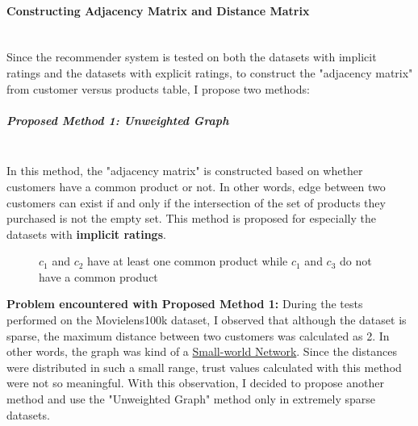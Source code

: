 	\paragraph{Constructing Adjacency Matrix and Distance Matrix}\mbox{}\\
	Since the recommender system is tested on both the datasets with implicit ratings and the datasets with explicit ratings, to construct the "adjacency matrix" from customer versus products table, I propose two methods: 
	\subparagraph{Proposed Method 1: Unweighted Graph}\mbox{}\\
	\label{prop_method_1}
	In this method, the "adjacency matrix" is constructed based on whether customers have a common product or not. In other words, edge between two customers can exist if and only if the intersection of the set of products they purchased is not the empty set. This method is proposed for especially the datasets with \textbf{implicit ratings}.
	\begin{figure}[H]
		\centering
		\caption{$c_{1}$ and $c_{2}$ have at least one common product while $c_{1}$ and $c_{3}$ do not have a common product}
	\end{figure}

	\textbf{Problem encountered with Proposed Method 1:} During the tests performed on the Movielens100k dataset, I observed that although the dataset is sparse, the maximum distance between two customers was calculated as 2. In other words, the graph was kind of a \href{https://en.wikipedia.org/wiki/Small-world_network}{Small-world Network}. Since the distances were distributed in such a small range, trust values calculated with this method were not so meaningful. With this observation, I decided to propose another method and use the "Unweighted Graph" method only in extremely sparse datasets.
	
